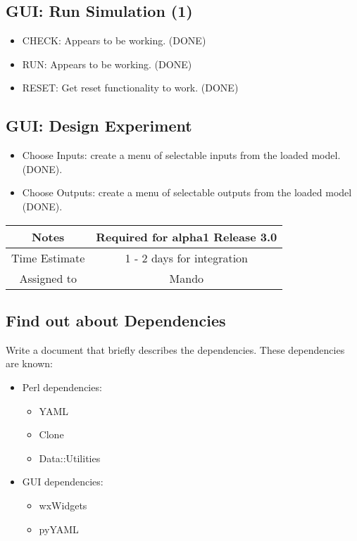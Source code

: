 \documentclass[12pt]{article}
\begin{document}
\subsection{GUI: Run Simulation (1)}
\begin{itemize}
\item CHECK: Appears to be working. (DONE)
\item RUN: Appears to be working. (DONE)      
\item RESET: Get reset functionality to work. (DONE)
\end{itemize}


\subsection{GUI: Design Experiment}
\begin{itemize}
\item Choose Inputs: create a menu of selectable inputs from the
  loaded model. (DONE).
\item Choose Outputs: create a menu of selectable outputs from the
  loaded model (DONE).
\end{itemize}

{
  \vspace{5mm}
  \centering
  \begin{tabular}{|c|c|}
    \hline
    Notes
    & Required for alpha1 Release 3.0 \\
    \hline
    Time Estimate
    & 1 - 2 days for integration \\
    \hline
    Assigned to
    & Mando \\
    \hline
  \end{tabular}
}


\subsection{Find out about Dependencies}

Write a document that briefly describes the dependencies.  These
dependencies are known:
\begin{itemize}
\item Perl dependencies:
  \begin{itemize}
  \item YAML
  \item Clone
  \item Data::Utilities
  \end{itemize}
\item GUI dependencies:
  \begin{itemize}
  \item wxWidgets
  \item pyYAML
  \end{itemize}
\end{itemize}
\end{document}
